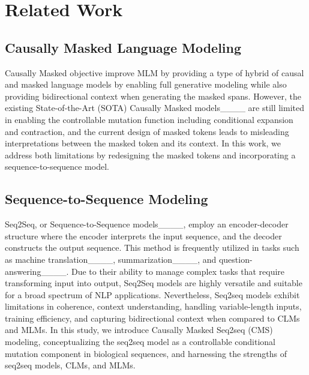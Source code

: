 \section{Related Work}
\label{sec:related}










\subsection{Causally Masked Language Modeling}

Causally Masked objective improve MLM by providing a type of hybrid of causal and masked language models by enabling full generative modeling while also providing bidirectional context when generating the masked spans. 
However, the existing State-of-the-Art (SOTA) Causally Masked models____ are still limited in enabling the controllable mutation function including conditional expansion and contraction, and the current design of masked tokens leads to misleading interpretations between the masked token and its context. In this work, we address both limitations by redesigning the masked tokens and incorporating a sequence-to-sequence model.

\subsection{Sequence-to-Sequence Modeling }

Seq2Seq, or Sequence-to-Sequence models____, employ an encoder-decoder structure where the encoder interprets the input sequence, and the decoder constructs the output sequence. This method is frequently utilized in tasks such as machine translation____, summarization____, and question-answering____. Due to their ability to manage complex tasks that require transforming input into output, Seq2Seq models are highly versatile and suitable for a broad spectrum of NLP applications.
Nevertheless, Seq2seq models exhibit limitations in coherence, context understanding, handling variable-length inputs, training efficiency, and capturing bidirectional context when compared to CLMs and MLMs. In this study, we introduce Causally Masked Seq2seq (CMS) modeling, conceptualizing the seq2seq model as a controllable conditional mutation component in biological sequences, and harnessing the strengths of seq2seq models, CLMs, and MLMs.














